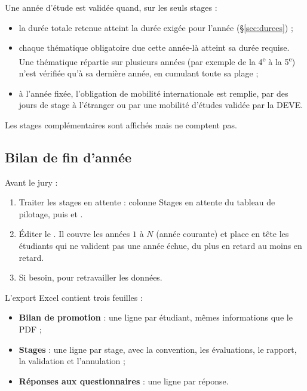 \documentclass[11pt,a4paper]{article}
\begin{document}
Une année d'étude est validée quand, sur les seuls stages  :
\begin{itemize}
  \item la durée totale retenue atteint la durée exigée pour l'année
        (§\ref{sec:durees}) ;
  \item chaque thématique obligatoire due cette année-là atteint sa durée
        requise. Une thématique répartie sur plusieurs années (par exemple de la
        4\textsuperscript{e} à la 5\textsuperscript{e}) n'est vérifiée qu'à sa
        dernière année, en cumulant toute sa plage ;
  \item à l'année fixée, l'obligation de mobilité internationale est remplie,
        par des jours de stage à l'étranger ou par une mobilité d'études
        validée par la DEVE.
\end{itemize}
Les stages complémentaires sont affichés mais ne comptent pas.

\subsection{Bilan de fin d'année}

Avant le jury :
\begin{enumerate}
  \item Traiter les stages en attente : colonne \og Stages en attente\fg{} du
        tableau de pilotage, puis  et
        .
  \item Éditer le . Il couvre les années
        \(1\) à \(N\) (année courante) et place en tête les étudiants qui ne
        valident pas une année échue, du plus en retard au moins en retard.
  \item Si besoin,  pour retravailler les données.
\end{enumerate}


L'export Excel contient trois feuilles :
\begin{itemize}
  \item \textbf{Bilan de promotion} : une ligne par étudiant, mêmes informations
        que le PDF ;
  \item \textbf{Stages} : une ligne par stage, avec la convention, les
        évaluations, le rapport, la validation et l'annulation ;
  \item \textbf{Réponses aux questionnaires} : une ligne par réponse.
\end{itemize}
\end{document}
